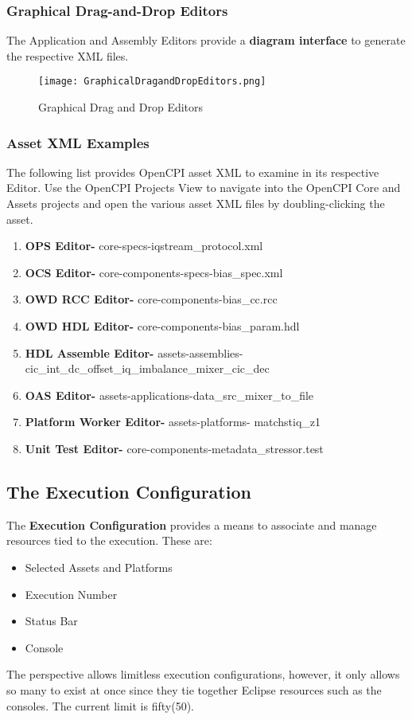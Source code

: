 \documentclass[10pt, a4paper, oneside]{article}
\begin{document}
\subsubsection{Graphical Drag-and-Drop Editors}
The Application and Assembly Editors provide a \textbf{diagram interface} to generate the respective XML files.
\begin{figure}[h!]
	\centering
	\caption{Graphical Drag and Drop Editors}\label{fig:GraphicalDragandDropEditors}
	\texttt{[image: GraphicalDragandDropEditors.png]}
 \end{figure}

\subsubsection{Asset XML Examples}
The following list provides OpenCPI asset XML to examine in its respective Editor. Use the OpenCPI Projects View to navigate into the OpenCPI Core and Assets projects and open the various asset XML files by doubling-clicking the asset. \\
\begin{enumerate}
\item	\textbf{OPS Editor-} core-specs-iqstream\_protocol.xml
\item	\textbf{OCS Editor-} core-components-specs-bias\_spec.xml
\item	\textbf{OWD RCC Editor-} core-components-bias\_cc.rcc
\item	\textbf{OWD HDL Editor-} core-components-bias\_param.hdl
\item	\textbf{HDL Assemble Editor-} assets-assemblies-cic\_int\_dc\_offset\_iq\_imbalance\_mixer\_cic\_dec
\item	\textbf{OAS Editor-} assets-applications-data\_src\_mixer\_to\_file
\item	\textbf{Platform Worker Editor-} assets-platforms- matchstiq\_z1
\item	\textbf{Unit Test Editor-} core-components-metadata\_stressor.test
\end{enumerate}

\subsection{The Execution Configuration}
The \textbf{Execution Configuration} provides a means to associate and manage resources tied to the execution. These are:
\begin{itemize}
\item	Selected Assets and Platforms
\item	Execution Number
\item	Status Bar
\item	Console
\end{itemize}
The perspective allows limitless execution configurations,  however,  it only allows so many to exist at once since they tie together Eclipse resources such as the consoles. The current limit is fifty(50). \\
\end{document}
